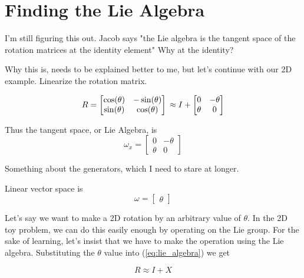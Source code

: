 \documentclass{article}
\begin{document}
\section{Finding the Lie Algebra}
  I'm still figuring this out. Jacob says "the Lie algebra is the tangent space of the rotation matrices at the identity element" Why at the identity?

  Why this is, needs to be explained better to me, but let's continue with our 2D example. Linearize the rotation matrix.

  \begin{equation} \label{eq:lie_algebra}
    R = \left[\begin{matrix} \cos(\theta) & -\sin(\theta) \\
                             \sin(\theta) & \cos(\theta) \end{matrix}\right] \\
      \approx I + \left[\begin{matrix} 0      & -\theta \\
                                       \theta & 0       \end{matrix}\right]
  \end{equation}

  Thus the tangent space, or Lie Algebra, is
  \begin{equation}
    \omega_x = \left[\begin{matrix} 0      & -\theta \\
                                    \theta & 0       \end{matrix}\right]
  \end{equation}

  Something about the generators, which I need to stare at longer.

  Linear vector space is
  \begin{equation}
    \omega = \left[\begin{matrix} \theta \end{matrix}\right]
  \end{equation}

  Let's say we want to make a 2D rotation by an arbitrary value of $\theta$. In the 2D toy problem, we can do this easily enough by operating on the Lie group. For the sake of learning, let's insist that we have to make the operation using the Lie algebra. Substituting the $\theta$ value into (\ref{eq:lie_algebra}) we get

  \begin{equation}
    R \approx I + X
  \end{equation}
\end{document}
